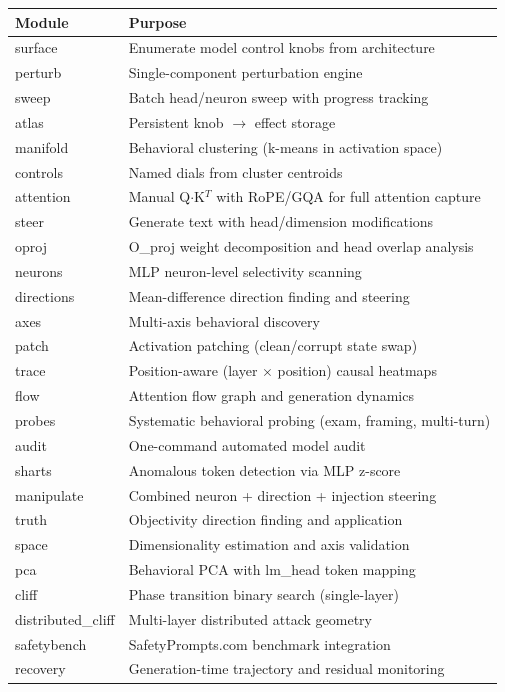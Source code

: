 \documentclass[11pt,a4paper]{article}
\begin{document}
\begin{longtable}{lp{10cm}}
\toprule
\textbf{Module} & \textbf{Purpose} \\
\midrule
\endhead
surface & Enumerate model control knobs from architecture \\
perturb & Single-component perturbation engine \\
sweep & Batch head/neuron sweep with progress tracking \\
atlas & Persistent knob $\rightarrow$ effect storage \\
manifold & Behavioral clustering (k-means in activation space) \\
controls & Named dials from cluster centroids \\
attention & Manual Q$\cdot$K$^T$ with RoPE/GQA for full attention capture \\
steer & Generate text with head/dimension modifications \\
oproj & O\_proj weight decomposition and head overlap analysis \\
neurons & MLP neuron-level selectivity scanning \\
directions & Mean-difference direction finding and steering \\
axes & Multi-axis behavioral discovery \\
patch & Activation patching (clean/corrupt state swap) \\
trace & Position-aware (layer $\times$ position) causal heatmaps \\
flow & Attention flow graph and generation dynamics \\
probes & Systematic behavioral probing (exam, framing, multi-turn) \\
audit & One-command automated model audit \\
sharts & Anomalous token detection via MLP z-score \\
manipulate & Combined neuron + direction + injection steering \\
truth & Objectivity direction finding and application \\
space & Dimensionality estimation and axis validation \\
pca & Behavioral PCA with lm\_head token mapping \\
cliff & Phase transition binary search (single-layer) \\
distributed\_cliff & Multi-layer distributed attack geometry \\
safetybench & SafetyPrompts.com benchmark integration \\
recovery & Generation-time trajectory and residual monitoring \\
\bottomrule
\end{longtable}
\end{document}
